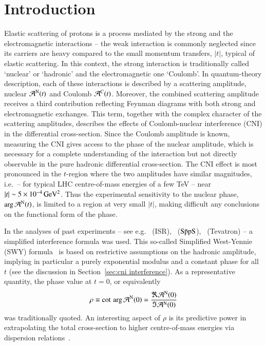 \section{Introduction}
\label{sec:introduction}

Elastic scattering of protons is a process mediated by the strong and the electromagnetic interactions -- the weak interaction is commonly neglected since its carriers are heavy compared to the small momentum transfers, $|t|$, typical of elastic scattering. In this context, the strong interaction is traditionally called `nuclear' or `hadronic' and the electromagnetic one `Coulomb'. In quantum-theory description, each of these interactions is described by a scattering amplitude, nuclear ${\cal A}^{\rm N}(t)$ and Coulomb ${\cal A}^{\rm C}(t)$. Moreover, the combined scattering amplitude receives a third contribution reflecting Feynman diagrams with both strong and electromagnetic exchanges. This term, together with the complex character of the scattering amplitudes, describes the effects of Coulomb-nuclear interference (CNI) in the differential cross-section. Since the Coulomb amplitude is known, measuring the CNI gives access to the phase of the nuclear amplitude, which is necessary for a complete understanding of the interaction but not directly observable in the pure hadronic differential cross-section. The CNI effect is most pronounced in the $t$-region where the two amplitudes have similar magnitudes, i.e.~-- for typical LHC centre-of-mass energies of a few TeV -- near $|t| \sim 5 \times 10^{-4}\,\rm GeV^{2}$. Thus the experimental sensitivity to the nuclear phase, $\arg {\cal A}^{\rm N}(t)$, is limited to a region at very small $|t|$, making difficult any conclusions on the 
functional form of the phase.

In the analyses of past experiments -- see e.g.~\cite{plb43,plb66,npb141,prl47,plb115,plb120,plb128,npb262} (ISR),~\cite{plb198,plb316} ($\rm S\bar{p}pS$),~\cite{prl68} (Tevatron) --
a simplified interference formula was used. This so-called
Simplified West-Yennie (SWY) formula~\cite{wy68} is based on restrictive assumptions on the 
hadronic amplitude, implying in particular a purely exponential modulus and a 
constant phase for all $t$ (see the discussion in 
Section~\ref{sec:cni interference}).
As a representative quantity, the phase value at $t=0$, or equivalently
\begin{equation}
\label{eq:rho def}
\rho \equiv \cot \, \arg {\cal A}^{\rm N} (0) = \frac{\Re {\cal A}^{\rm N} (0)}{\Im {\cal A}^{\rm N} (0)}
\end{equation}
was traditionally quoted. 
An interesting aspect of $\rho$ is its predictive power in extrapolating the total cross-section to higher centre-of-mass energies via dispersion 
relations~\cite{dremin-dispersion}. 

